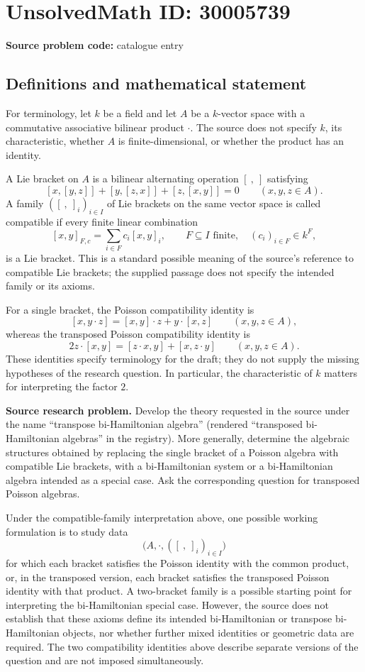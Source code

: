 \documentclass[11pt]{article}
\begin{document}
\section*{UnsolvedMath ID: 30005739}
\textbf{Source problem code:} catalogue entry
\subsection{Definitions and mathematical statement}
For terminology, let \(k\) be a field and let \(A\) be a \(k\)-vector space with a commutative associative bilinear product \(\cdot\). The source does not specify \(k\), its characteristic, whether \(A\) is finite-dimensional, or whether the product has an identity.

A Lie bracket on \(A\) is a bilinear alternating operation \([\ ,\ ]\) satisfying
\[
[x,[y,z]]+[y,[z,x]]+[z,[x,y]]=0
\qquad(x,y,z\in A).
\]
A family \(([\ ,\ ]_i)_{i\in I}\) of Lie brackets on the same vector space is called compatible if every finite linear combination
\[
[x,y]_{F,c}=\sum_{i\in F}c_i[x,y]_i,
\qquad F\subseteq I\text{ finite},\quad (c_i)_{i\in F}\in k^F,
\]
is a Lie bracket. This is a standard possible meaning of the source's reference to compatible Lie brackets; the supplied passage does not specify the intended family or its axioms.

For a single bracket, the Poisson compatibility identity is
\[
[x,y\cdot z]=[x,y]\cdot z+y\cdot[x,z]
\qquad(x,y,z\in A),
\]
whereas the transposed Poisson compatibility identity is
\[
2z\cdot[x,y]=[z\cdot x,y]+[x,z\cdot y]
\qquad(x,y,z\in A).
\]
These identities specify terminology for the draft; they do not supply the missing hypotheses of the research question. In particular, the characteristic of \(k\) matters for interpreting the factor \(2\).

\textbf{Source research problem.} Develop the theory requested in the source under the name ``transpose bi-Hamiltonian algebra'' (rendered ``transposed bi-Hamiltonian algebras'' in the registry). More generally, determine the algebraic structures obtained by replacing the single bracket of a Poisson algebra with compatible Lie brackets, with a bi-Hamiltonian system or a bi-Hamiltonian algebra intended as a special case. Ask the corresponding question for transposed Poisson algebras.

Under the compatible-family interpretation above, one possible working formulation is to study data
\[
\bigl(A,\cdot,([\ ,\ ]_i)_{i\in I}\bigr)
\]
for which each bracket satisfies the Poisson identity with the common product, or, in the transposed version, each bracket satisfies the transposed Poisson identity with that product. A two-bracket family is a possible starting point for interpreting the bi-Hamiltonian special case. However, the source does not establish that these axioms define its intended bi-Hamiltonian or transpose bi-Hamiltonian objects, nor whether further mixed identities or geometric data are required. The two compatibility identities above describe separate versions of the question and are not imposed simultaneously.
\end{document}
